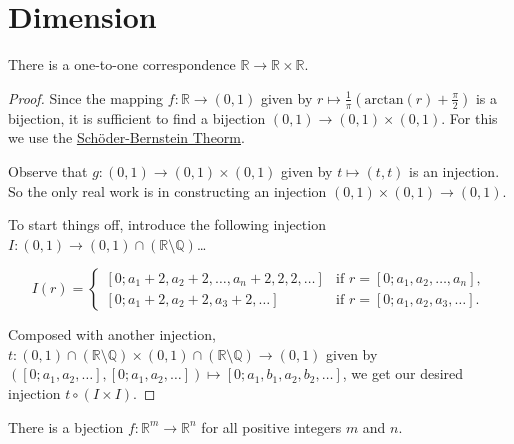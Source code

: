 \newpage

\section{Dimension}\label{dimension}

\begin{theorem}
There is a one-to-one correspondence $\mathbb{R} \rightarrow \mathbb{R} \times \mathbb{R}$.
\end{theorem}

\begin{proof}
Since the mapping $f: \mathbb{R} \rightarrow (0,1)$ given by $ r \mapsto \frac{1}{\pi}(\textrm{arctan}(r) + \frac{\pi}{2})$ is a bijection, it is sufficient
to find a bijection $(0,1) \rightarrow (0,1) \times (0,1)$. For this we use the \hyperref[schroderbernsteinthm]{Sch\"oder-Bernstein Theorm}.

Observe that $g:(0,1) \rightarrow (0,1) \times (0,1)$ given by $t \mapsto (t,t)$ is an injection. So the only real work is in constructing an injection $(0,1) \times (0,1) \rightarrow (0,1)$.

To start things off, introduce the following injection $I :(0,1) \rightarrow (0,1)\cap(\mathbb{R} \setminus \mathbb{Q})$\dots

\[
I(r) = \begin{cases}
			[0;a_1+2,a_2+2,\dots,a_n+2,2,2,\dots] & \textrm{if } r=[0;a_1,a_2,\dots,a_n],\\
			[0;a_1+2,a_2+2,a_3+2,\dots] & \textrm{if } r=[0;a_1,a_2,a_3,\dots].
	   \end{cases}
\]

\noindent Composed with another injection, $t:(0,1)\cap(\mathbb{R} \setminus \mathbb{Q}) \times (0,1)\cap(\mathbb{R} \setminus \mathbb{Q}) \rightarrow (0,1)$ given by $([0;a_1,a_2,\dots],[0;a_1,a_2,\dots]) \mapsto [0;a_1,b_1,a_2,b_2,\dots]$, we get
our desired injection $t \circ (I \times I).$
\end{proof}

\begin{corollary}
There is a bjection $f : \mathbb{R}^m \rightarrow \mathbb{R}^n$ for all positive integers $m$ and $n$. 
\end{corollary}